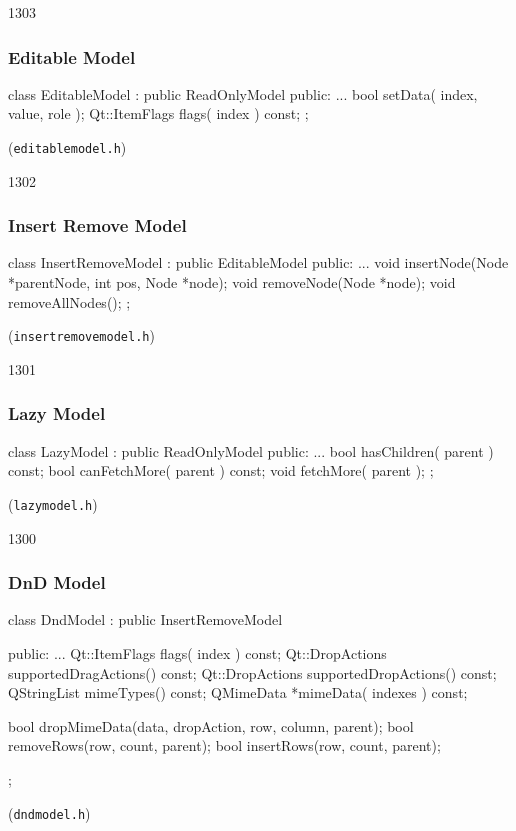\begin{slide}[fragile]{1303}
  \frametitle{Editable Model}
  \begin{cpp}
class EditableModel : public ReadOnlyModel {
public:
  ...
  bool setData( index, value, role );
  Qt::ItemFlags flags( index ) const;
};
  \end{cpp}
   \footnotesize{ (\texttt{editablemodel.h})}
\end{slide}

\begin{slide}[fragile]{1302}
  \frametitle{Insert Remove Model}
  \begin{cpp}
class InsertRemoveModel : public EditableModel {
public:
    ...
    void insertNode(Node *parentNode, int pos, Node *node);
    void removeNode(Node *node);
    void removeAllNodes();
}; 
  \end{cpp}
   \footnotesize{ (\texttt{insertremovemodel.h})}
\end{slide}

\begin{slide}[fragile]{1301}
  \frametitle{Lazy Model}
  \begin{cpp}
class LazyModel : public ReadOnlyModel {
public:
  ...
  bool hasChildren( parent ) const;
  bool canFetchMore( parent ) const;
  void fetchMore( parent );
};    
  \end{cpp}
   \footnotesize{ (\texttt{lazymodel.h})}
\end{slide}

\begin{slide}[fragile]{1300}
  \frametitle{DnD Model}
  \begin{cpp}
class DndModel : public InsertRemoveModel {
public:
  ...
  Qt::ItemFlags flags( index ) const;
  Qt::DropActions supportedDragActions() const;
  Qt::DropActions supportedDropActions() const;
  QStringList mimeTypes() const;
  QMimeData *mimeData( indexes ) const;

  bool dropMimeData(data, dropAction, row, column, parent);
  bool removeRows(row, count, parent);
  bool insertRows(row, count, parent);
};    
  \end{cpp}
   \footnotesize{(\texttt{dndmodel.h})}
\end{slide}

